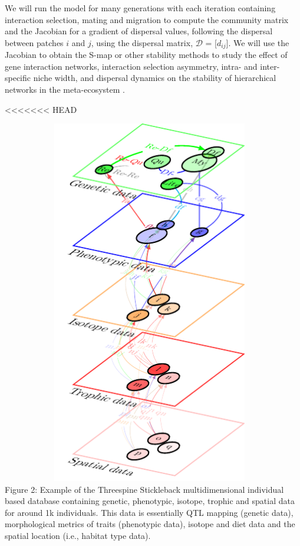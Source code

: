 \documentclass[12pt]{article}
\begin{document}
\begin{center}
\begin{mybox}
\begin{singlespace}
\begin{small}
We will run the model for many generations with each iteration
containing interaction selection, mating and migration to compute the
community matrix and the Jacobian for a gradient of dispersal values,
following the dispersal between patches $i$ and $j$, using the
dispersal matrix, $\mathcal{D}$ = [$d_{ij}$]. We will use the Jacobian
to obtain the S-map or other stability methods to study the effect of
gene interaction networks, interaction selection asymmetry, intra- and
inter-specific niche width, and dispersal dynamics on the stability of
hierarchical networks in the meta-ecosystem
\citep{Graveletal:2016,Deyletal:2017}.
 \end{small}
\end{singlespace}
\end{mybox}

<<<<<<< HEAD

\begin{center}
\hspace{-1 in}\includegraphics[width=13cm,height=16cm]{Figure2Stickle.pdf}
\\
\caption{{\small Figure 2: Example of the Threespine Stickleback multidimensional individual based database containing genetic, phenotypic, isotope, trophic and spatial data for around 1k individuals. This data is essentially QTL mapping (genetic data), morphological metrics of traits (phenotypic data), isotope and diet data and the spatial location (i.e., habitat type data).}}
\vspace{2 in}
\label{Figure 1}
\end{center}
\vspace{-4 in}


\end{center}
\end{document}
